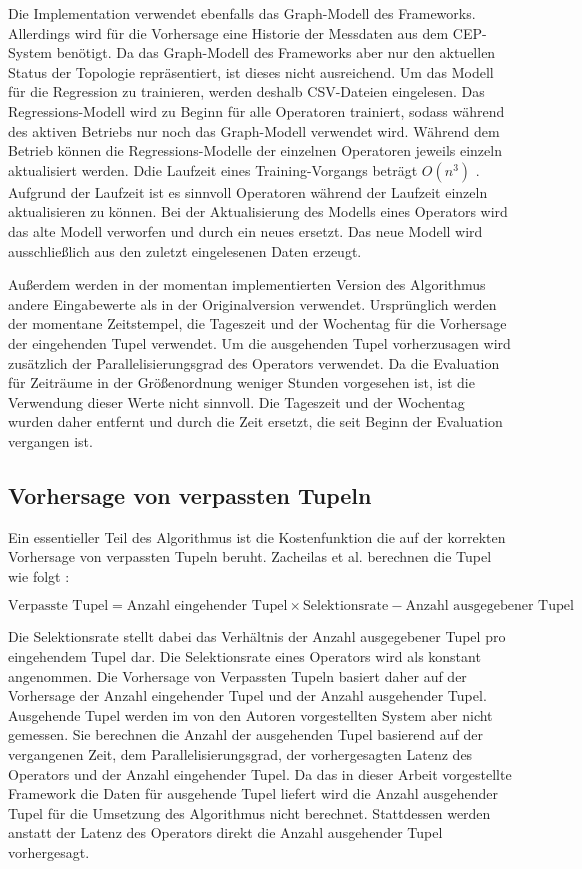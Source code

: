 Die Implementation verwendet ebenfalls das Graph-Modell des Frameworks.
Allerdings wird für die Vorhersage eine Historie der Messdaten aus dem CEP-System benötigt.
Da das Graph-Modell des Frameworks aber nur den aktuellen Status der Topologie repräsentiert, ist dieses nicht ausreichend.
Um das Modell für die Regression zu trainieren, werden deshalb CSV-Dateien eingelesen.
Das Regressions-Modell wird zu Beginn für alle Operatoren trainiert, sodass während des aktiven Betriebs nur noch das Graph-Modell verwendet wird.
Während dem Betrieb können die Regressions-Modelle der einzelnen Operatoren jeweils einzeln aktualisiert werden.
Ddie Laufzeit eines Training-Vorgangs beträgt \(O(n^3)\) \cite{zacheilas_elastic_2015}.
Aufgrund der Laufzeit ist es sinnvoll Operatoren während der Laufzeit einzeln aktualisieren zu können.
Bei der Aktualisierung des Modells eines Operators wird das alte Modell verworfen und durch ein neues ersetzt.
Das neue Modell wird ausschließlich aus den zuletzt eingelesenen Daten erzeugt.

Außerdem werden in der momentan implementierten Version des Algorithmus andere Eingabewerte als in der Originalversion verwendet.
Ursprünglich werden der momentane Zeitstempel, die Tageszeit und der Wochentag für die Vorhersage der eingehenden Tupel verwendet.
Um die ausgehenden Tupel vorherzusagen wird zusätzlich der Parallelisierungsgrad des Operators verwendet.
Da die Evaluation für Zeiträume in der Größenordnung weniger Stunden vorgesehen ist, ist die Verwendung dieser Werte nicht sinnvoll.
Die Tageszeit und der Wochentag wurden daher entfernt und durch die Zeit ersetzt, die seit Beginn der Evaluation vergangen ist.

\subsection{Vorhersage von verpassten Tupeln}

Ein essentieller Teil des Algorithmus ist die Kostenfunktion die auf der korrekten Vorhersage von verpassten Tupeln beruht.
Zacheilas et al. berechnen die Tupel wie folgt \cite{zacheilas_elastic_2015}:

\[\text{Verpasste Tupel} = \text{Anzahl eingehender Tupel} \times \text{Selektionsrate} - \text{Anzahl ausgegebener Tupel}\]

Die Selektionsrate stellt dabei das Verhältnis der Anzahl ausgegebener Tupel pro eingehendem Tupel dar.
Die Selektionsrate eines Operators wird als konstant angenommen.
Die Vorhersage von Verpassten Tupeln basiert daher auf der Vorhersage der Anzahl eingehender Tupel und der Anzahl ausgehender Tupel.
Ausgehende Tupel werden im von den Autoren vorgestellten System aber nicht gemessen.
Sie berechnen die Anzahl der ausgehenden Tupel basierend auf der vergangenen Zeit, dem Parallelisierungsgrad, der vorhergesagten Latenz des Operators und der Anzahl eingehender Tupel.
Da das in dieser Arbeit vorgestellte Framework die Daten für ausgehende Tupel liefert wird die Anzahl ausgehender Tupel für die Umsetzung des Algorithmus nicht berechnet.
Stattdessen werden anstatt der Latenz des Operators direkt die Anzahl ausgehender Tupel vorhergesagt.

